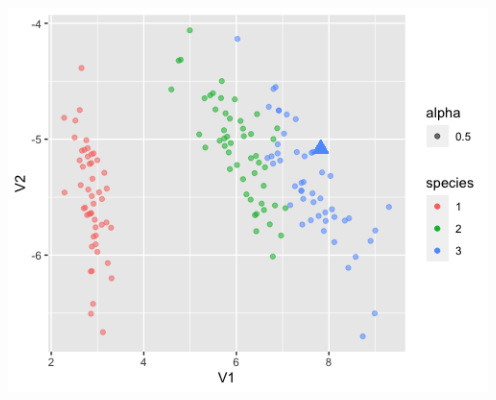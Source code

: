 \begin{enumerate}
\begin{center}
	\includegraphics[width=5.0in]{II_6_scatter.png}
\end{center}


\end{enumerate}


